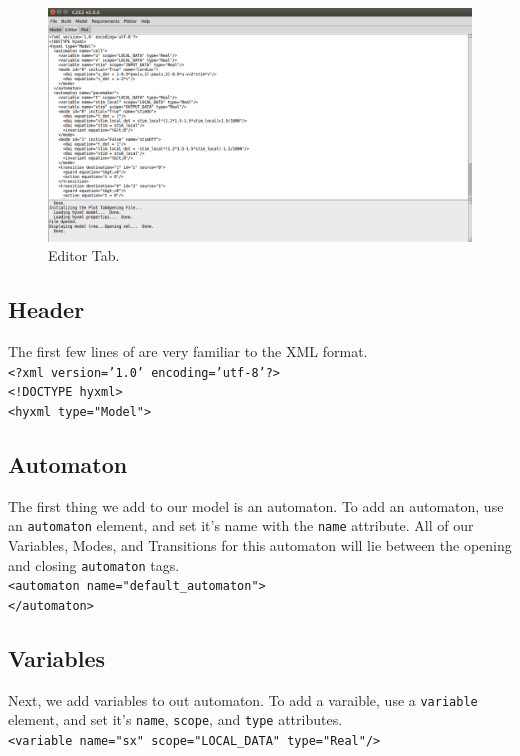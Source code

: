 \documentclass{tufte-book} %
\begin{document}
\begin{figure}[h!]
\centerline{\includegraphics[scale=.22,keepaspectratio=true]{ManualImages/C2E2_version2.0/editor-tab.png}}
\caption{Editor Tab.} 
\label{fig:editor_tab}
\end{figure}

\subsection{Header}
The first few lines of are very familiar to the XML format.\\
\texttt{<?xml version='1.0' encoding='utf-8'?>}\\
\texttt{<!DOCTYPE hyxml>}\\
\texttt{<hyxml type="Model">}\\

\subsection{Automaton}
The first thing we add to our model is an automaton. To add an automaton, use an \texttt{automaton} element, and set it's name with the \texttt{name} attribute. All of our Variables, Modes, and Transitions for this automaton will lie between the opening and closing \texttt{automaton} tags.\\
\vspace{3mm}
\texttt{<automaton name="default\_automaton">}\\
\texttt{</automaton>}

\subsection{Variables}
Next, we add variables to out automaton. To add a varaible, use a \texttt{variable} element, and set it's \texttt{name}, \texttt{scope}, and \texttt{type} attributes.\\
\vspace{3mm}
\texttt{<variable name="sx" scope="LOCAL\_DATA" type="Real"/>}
\end{document}
